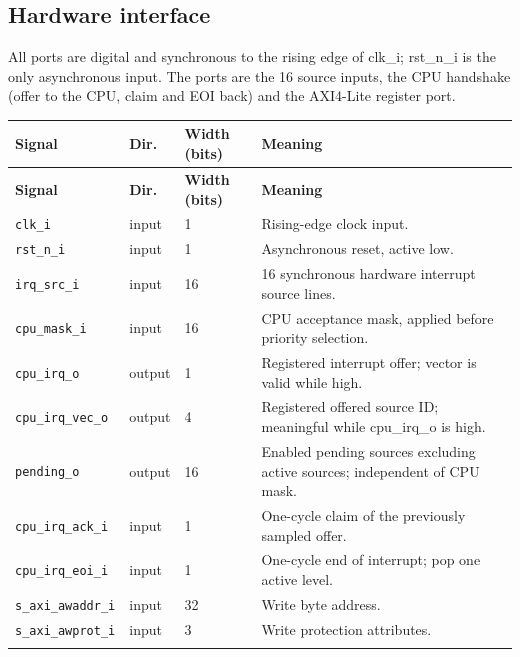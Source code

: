\documentclass[11pt]{article}
\begin{document}
\subsection{Hardware interface}
\noindent All ports are digital and synchronous to the rising edge of clk\_i; rst\_n\_i is the only asynchronous input. The ports are the 16 source inputs, the CPU handshake (offer to the CPU, claim and EOI back) and the AXI4-Lite register port.\par\medskip
{\small
\begin{longtable}{@{}L{0.3400\dimexpr\linewidth-36pt\relax}L{0.1000\dimexpr\linewidth-36pt\relax}L{0.1000\dimexpr\linewidth-36pt\relax}L{0.4600\dimexpr\linewidth-36pt\relax}@{}}
\toprule
\textbf{Signal} & \textbf{Dir.} & \textbf{Width (bits)} & \textbf{Meaning} \\ \midrule
\endfirsthead
\toprule
\textbf{Signal} & \textbf{Dir.} & \textbf{Width (bits)} & \textbf{Meaning} \\ \midrule
\endhead
\texttt{clk\_i} & input & 1 & Rising-edge clock input. \\ \addlinespace[3pt]
\texttt{rst\_n\_i} & input & 1 & Asynchronous reset, active low. \\ \addlinespace[3pt]
\texttt{irq\_src\_i} & input & 16 & 16 synchronous hardware interrupt source lines. \\ \addlinespace[3pt]
\texttt{cpu\_mask\_i} & input & 16 & CPU acceptance mask, applied before priority selection. \\ \addlinespace[3pt]
\texttt{cpu\_irq\_o} & output & 1 & Registered interrupt offer; vector is valid while high. \\ \addlinespace[3pt]
\texttt{cpu\_irq\_vec\_o} & output & 4 & Registered offered source ID; meaningful while cpu\_irq\_o is high. \\ \addlinespace[3pt]
\texttt{pending\_o} & output & 16 & Enabled pending sources excluding active sources; independent of CPU mask. \\ \addlinespace[3pt]
\texttt{cpu\_irq\_ack\_i} & input & 1 & One-cycle claim of the previously sampled offer. \\ \addlinespace[3pt]
\texttt{cpu\_irq\_eoi\_i} & input & 1 & One-cycle end of interrupt; pop one active level. \\ \addlinespace[3pt]
\texttt{s\_axi\_awaddr\_i} & input & 32 & Write byte address. \\ \addlinespace[3pt]
\texttt{s\_axi\_awprot\_i} & input & 3 & Write protection attributes. \\ \addlinespace[3pt]

\end{longtable}}
\end{document}
